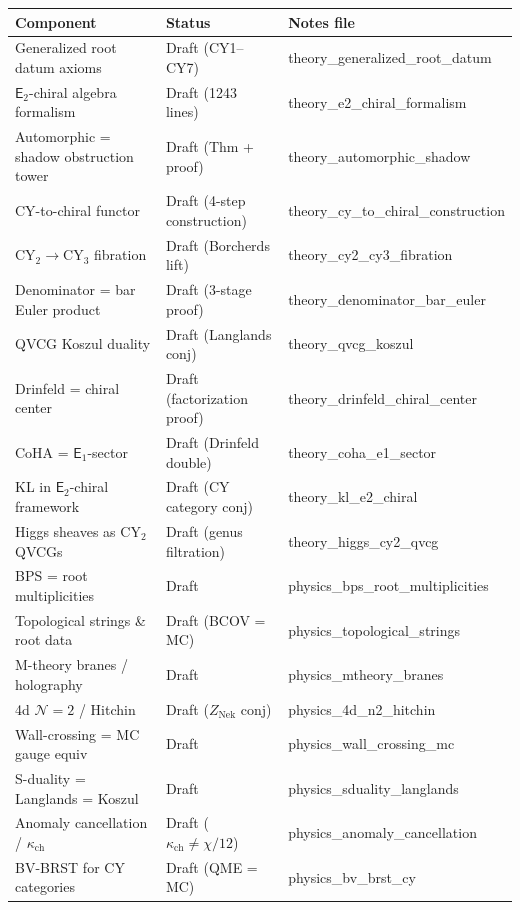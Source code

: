 \documentclass[11pt]{article}
\newcommand{\Eone}{\mathsf{E}_1}
\newcommand{\Etwo}{\mathsf{E}_2}
\newcommand{\CY}{\mathrm{CY}}
\begin{document}
\begin{center}
\renewcommand{\arraystretch}{1.3}
\begin{tabular}{lll}
 \toprule
 \textbf{Component} & \textbf{Status} & \textbf{Notes file} \\
 \midrule
 Generalized root datum axioms & Draft (CY1--CY7) & theory\_generalized\_root\_datum \\
 $\Etwo$-chiral algebra formalism & Draft (1243 lines) & theory\_e2\_chiral\_formalism \\
 Automorphic = shadow obstruction tower & Draft (Thm + proof) & theory\_automorphic\_shadow \\
 CY-to-chiral functor & Draft (4-step construction) & theory\_cy\_to\_chiral\_construction \\
 $\CY_2 \to \CY_3$ fibration & Draft (Borcherds lift) & theory\_cy2\_cy3\_fibration \\
 Denominator = bar Euler product & Draft (3-stage proof) & theory\_denominator\_bar\_euler \\
 QVCG Koszul duality & Draft (Langlands conj) & theory\_qvcg\_koszul \\
 Drinfeld = chiral center & Draft (factorization proof) & theory\_drinfeld\_chiral\_center \\
 CoHA = $\Eone$-sector & Draft (Drinfeld double) & theory\_coha\_e1\_sector \\
 KL in $\Etwo$-chiral framework & Draft (CY category conj) & theory\_kl\_e2\_chiral \\
 Higgs sheaves as $\CY_2$ QVCGs & Draft (genus filtration) & theory\_higgs\_cy2\_qvcg \\
 \midrule
 BPS = root multiplicities & Draft & physics\_bps\_root\_multiplicities \\
 Topological strings \& root data & Draft (BCOV = MC) & physics\_topological\_strings \\
 M-theory branes / holography & Draft & physics\_mtheory\_branes \\
 4d $\mathcal{N}=2$ / Hitchin & Draft ($Z_{\mathrm{Nek}}$ conj) & physics\_4d\_n2\_hitchin \\
 Wall-crossing = MC gauge equiv & Draft & physics\_wall\_crossing\_mc \\
 S-duality = Langlands = Koszul & Draft & physics\_sduality\_langlands \\
 Anomaly cancellation / $\kappa_{\mathrm{ch}}$ & Draft ($\kappa_{\mathrm{ch}} \neq \chi/12$) & physics\_anomaly\_cancellation \\
 BV-BRST for CY categories & Draft (QME = MC) & physics\_bv\_brst\_cy \\

\end{tabular}
\end{center}
\end{document}
